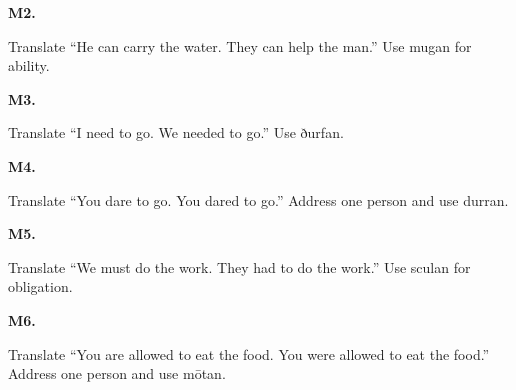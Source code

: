 \par\begin{minipage}{\linewidth}\raggedright
\textbf{M2.}

Translate “He can carry the water. They can help the man.” Use mugan for ability.

\end{minipage}\par\addvspace{4pt}

\par\begin{minipage}{\linewidth}\raggedright
\textbf{M3.}

Translate “I need to go. We needed to go.” Use ðurfan.

\end{minipage}\par\addvspace{4pt}

\par\begin{minipage}{\linewidth}\raggedright
\textbf{M4.}

Translate “You dare to go. You dared to go.” Address one person and use durran.

\end{minipage}\par\addvspace{4pt}

\par\begin{minipage}{\linewidth}\raggedright
\textbf{M5.}

Translate “We must do the work. They had to do the work.” Use sculan for obligation.

\end{minipage}\par\addvspace{4pt}

\par\begin{minipage}{\linewidth}\raggedright
\textbf{M6.}

Translate “You are allowed to eat the food. You were allowed to eat the food.” Address one person and use mōtan.

\end{minipage}\par\addvspace{4pt}

